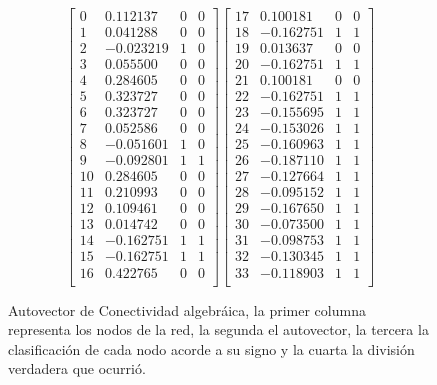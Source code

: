 \vspace{1em}
\begin{figure}[!htbp]
\begin{equation*}
    \begin{bmatrix}
        0   &0.112137 & 0 & 0 \\ 
        1   &0.041288 & 0 & 0 \\
        2   &-0.023219  & 1 & 0 \\
        3   &0.055500 & 0 & 0 \\
        4   &0.284605 & 0 & 0 \\
        5   &0.323727 & 0 & 0 \\
        6   &0.323727 & 0 & 0 \\
        7   &0.052586  & 0 & 0 \\
        8   &-0.051601 & 1 & 0 \\
        9   &-0.092801 & 1 & 1 \\
        10  &0.284605  & 0 & 0 \\
        11  &0.210993  & 0 & 0 \\
        12  &0.109461  & 0 & 0 \\
        13  &0.014742  & 0 & 0 \\
        14  &-0.162751 & 1 & 1 \\
        15  &-0.162751 & 1 & 1 \\
        16  &0.422765  & 0 & 0 \\
\end{bmatrix}
\begin{bmatrix}
        17  &0.100181  & 0 & 0 \\
        18  &-0.162751 & 1 & 1 \\
        19  &0.013637  & 0 & 0 \\
        20  &-0.162751 & 1 & 1 \\
        21  &0.100181  & 0 & 0 \\
        22  &-0.162751 & 1 & 1 \\
        23  &-0.155695 & 1 & 1 \\
        24  &-0.153026 & 1 & 1 \\
        25  &-0.160963 & 1 & 1 \\
        26  &-0.187110 & 1 & 1 \\
        27  &-0.127664 & 1 & 1 \\
        28  &-0.095152 & 1 & 1 \\
        29  &-0.167650 & 1 & 1 \\
        30  &-0.073500 & 1 & 1 \\
        31  &-0.098753 & 1 & 1 \\
        32  &-0.130345 & 1 & 1 \\
        33  &-0.118903 & 1 & 1 \\
    \end{bmatrix}
\end{equation*}
\caption{Autovector de Conectividad algebráica, la primer columna representa los nodos de la red, la segunda el autovector, la tercera la clasificación de cada nodo acorde a su signo y la cuarta la división verdadera que ocurrió.} \label{prediccion_karate}
\end{figure}

